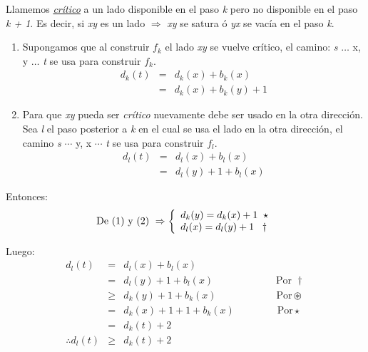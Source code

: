 \documentclass[12pt,a4paper]{report}
\begin{document}
			\par Llamemos \textit{\underline{crítico}} a un lado disponible en el paso \textit{k} pero no disponible en el paso \textit{k + 1}. Es decir, si \textit{xy} es un lado $\Rightarrow$ \textit{xy} se satura ó \textit{yx} se vacía en el paso \textit{k}.
			\begin{enumerate}
				\item Supongamos que al construir $f_{k}$ el lado \textit{xy} se vuelve crítico, el camino: \textit{s} $\dotsc$ x, y $\dotsc$ \textit{t} se usa para construir $f_{k}$.
				\begin{eqnarray}
					\nonumber d_{k}(\textit{t}) &=& d_{k}(x) + b_{k}(x) \\
					\nonumber &=& d_{k}(x) + b_{k}(y) + 1
				\end{eqnarray}

				\item Para que \textit{xy} pueda ser \textit{crítico} nuevamente debe ser usado en la otra dirección. Sea \textit{l} el paso posterior a \textit{k} en el cual se usa el lado en la otra dirección, el camino \textit{s} $\dotsb$ y, x $\dotsb$ \textit{t} se usa para construir $f_{l}$.
				\begin{eqnarray}
					\nonumber d_{l}(t) &=& d_{l}(x) + b_{l}(x) \\
					\nonumber &=& d_{l}(y) + 1 + b_{l}(x)
				\end{eqnarray}
			\end{enumerate}

			\par Entonces:
			\begin{equation*}
				\textup{De (1) y (2) } \Rightarrow
	  		\left \lbrace
	  		\begin{array}{l}
					d_{k}(y) = d_{k}(x) + 1 \; \; \star \\
	    		d_{l}(x) = d_{l}(y) + 1 \; \; \; \dag
	  		\end{array}
	  		\right.
			\end{equation*}

			\par Luego:
			\begin{eqnarray}
				\nonumber d_{l}(t) &=& d_{l}(x) + b_{l}(x) \\
				\nonumber &=& d_{l}(y) + 1 + b_{l}(x) \qquad\qquad\qquad\;\text{Por } \dag \\
				\nonumber & \geq & d_{k}(y) + 1 + b_{k}(x) \qquad\qquad\qquad\text{Por} \circledast \\
				\nonumber &=& d_{k}(x) + 1 + 1 + b_{k}(x) \;\qquad\qquad\text{Por} \star \\
				\nonumber &=& d_{k}(\textit{t}) + 2 \\
				\nonumber \therefore d_{l}(\textit{t}) & \geq & d_{k}(\textit{t}) + 2
			\end{eqnarray}
\end{document}

